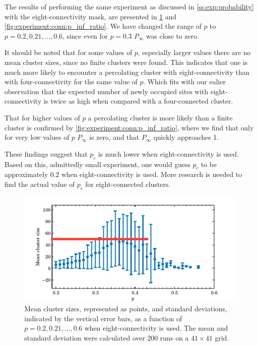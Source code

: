 The results of performing the same experiment as discussed in \cref{ss:exp:probability} with the eight-connectivity mask, are presented in \cref{fig:experiment:conn:mean_std_clusters} and \ref{fig:experiment:conn:p_inf_ratio}. We have changed the range of $p$ to $p = 0.2, 0.21, \dotsc, 0.6$, since even for $p = 0.3$ $P_\infty$ was close to zero. 

It should be noted that for some values of $p$, especially larger values there are no mean cluster sizes, since no finite clusters were found. This indicates that one is much more likely to encounter a percolating cluster with eight-connectivity than with four-connectivity for the same value of $p$. Which fits with our ealier observation that the expected number of newly occupied sites with eight-connectivity is twice as high when compared with a four-connected cluster.

That for higher values of $p$ a percolating cluster is more likely than a finite cluster is confirmed by \cref{fig:experiment:conn:p_inf_ratio}, where we find that only for very low values of $p$ $P_\infty$ is zero, and that $P_\infty$ quickly approaches 1. 

These findings suggest that $p_c$ is much lower when eight-connectivity is used. Based on this, admittedly small experiment, one would guess $p_c$ to be approximately $0.2$ when eight-connectivity is used. More research is needed to find the actual value of $p_c$ for eight-connected clusters.\\

\begin{figure}
	\centering
	\includegraphics[width=\textwidth]{./img/assignment_d_mean_std_p.pdf}
	\caption{Mean cluster sizes, represented as points, and standard deviations, indicated by the vertical error bars, as a function of $p = 0.2, 0.21, \dotsc, 0.6$ when eight-connectivity is used. The mean and standard deviation were calculated over $200$ runs on a $41 \times 41$ grid.}
	\label{fig:experiment:conn:mean_std_clusters}
\end{figure}

